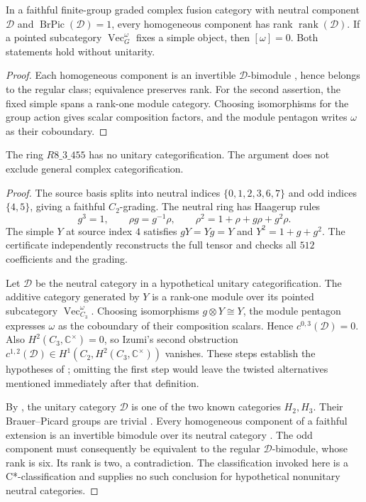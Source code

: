 \begin{lemma}
\label{lem:m3-graded-rank-untwisting}
In a faithful finite-group graded complex fusion category with neutral
component \(\mathcal D\) and \(\operatorname{BrPic}(\mathcal D)=1\),
every homogeneous component has rank \(\operatorname{rank}(\mathcal D)\).
If a pointed subcategory \(\operatorname{Vec}_G^\omega\) fixes a simple
object, then \([\omega]=0\).  Both statements hold without unitarity.
\end{lemma}
\begin{proof}
Each homogeneous component is an invertible \(\mathcal D\)-bimodule
\cite[Theorem~6.1(i)]{ENOExt}, hence belongs to the regular class;
equivalence preserves rank.  For the second assertion, the fixed
simple spans a rank-one module category.  Choosing isomorphisms for
the group action gives scalar composition factors, and the module
pentagon writes \(\omega\) as their coboundary.
\end{proof}

\begin{proposition}
\label{prop:m3-r455-unitary}
The ring \(R8\_3\_455\) has no unitary categorification.  The argument
does not exclude general complex categorification.
\end{proposition}
\begin{proof}
The source basis splits into neutral indices \(\{0,1,2,3,6,7\}\) and
odd indices \(\{4,5\}\), giving a faithful \(C_2\)-grading.  The neutral
ring has Haagerup rules
\[
 g^3=1,\qquad \rho g=g^{-1}\rho,\qquad
 \rho^2=1+\rho+g\rho+g^2\rho.
\]
The simple \(Y\) at source index \(4\) satisfies \(gY=Yg=Y\) and
\(Y^2=1+g+g^2\).  The certificate independently reconstructs the full
tensor and checks all \(512\) coefficients and the grading.

Let \(\mathcal D\) be the neutral category in a hypothetical unitary
categorification.  The additive category generated by \(Y\) is a
rank-one module over its pointed subcategory
\(\operatorname{Vec}_{C_3}^{\omega}\).  Choosing isomorphisms
\(g\otimes Y\cong Y\), the module pentagon expresses \(\omega\) as
the coboundary of their composition scalars.  Hence
\(c^{0,3}(\mathcal D)=0\).  Also
\(H^2(C_3,\mathbb C^\times)=0\), so Izumi's second obstruction
\(c^{1,2}(\mathcal D)\in H^1(C_2,H^2(C_3,\mathbb C^\times))\)
vanishes.  These steps establish the hypotheses of
\cite[Definition~2.7]{Izumi3n}; omitting the first step would leave the
twisted alternatives mentioned immediately after that definition.

By \cite[Theorems~5.9 and 9.1]{Izumi3n}, the unitary category
\(\mathcal D\) is one of the two known categories \(H_2,H_3\).
Their Brauer--Picard groups are trivial
\cite[Theorem~1.5]{GSHaagerup}.  Every homogeneous component of a
faithful extension is an invertible bimodule over its neutral category
\cite[Theorem~6.1(i)]{ENOExt}.  The odd component must consequently be
equivalent to the regular \(\mathcal D\)-bimodule, whose rank is six.
Its rank is two, a contradiction.  The classification invoked here is
a C*-classification and supplies no such conclusion for hypothetical
nonunitary neutral categories.
\end{proof}

